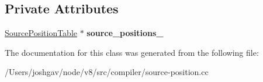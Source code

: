 \subsection*{Private Attributes}
\begin{DoxyCompactItemize}
\item 
\hyperlink{classv8_1_1internal_1_1compiler_1_1_source_position_table}{Source\+Position\+Table} $\ast$ {\bfseries source\+\_\+positions\+\_\+}\hypertarget{classv8_1_1internal_1_1compiler_1_1_source_position_table_1_1_decorator_a5bd1a515b33a3304cf9cc7cafb10518b}{}\label{classv8_1_1internal_1_1compiler_1_1_source_position_table_1_1_decorator_a5bd1a515b33a3304cf9cc7cafb10518b}

\end{DoxyCompactItemize}


The documentation for this class was generated from the following file\+:\begin{DoxyCompactItemize}
\item 
/\+Users/joshgav/node/v8/src/compiler/source-\/position.\+cc\end{DoxyCompactItemize}
